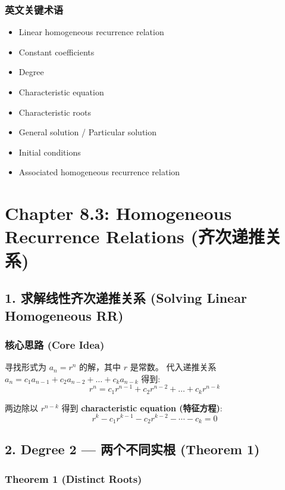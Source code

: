 \documentclass[10pt,a4paper,openany]{ctexbook}
\theoremstyle{definition}
\theoremstyle{remark}
\begin{document}
\subsubsection{英文关键术语}

\begin{itemize}
\item Linear homogeneous recurrence relation
\item Constant coefficients
\item Degree
\item Characteristic equation
\item Characteristic roots
\item General solution / Particular solution
\item Initial conditions
\item Associated homogeneous recurrence relation

\end{itemize}


\section{Chapter 8.3: Homogeneous Recurrence Relations (齐次递推关系)}

\subsection{1. 求解线性齐次递推关系 (Solving Linear Homogeneous RR)}

\subsubsection{核心思路 (Core Idea)}

寻找形式为 $a_n = r^n$ 的解，其中 $r$ 是常数。
代入递推关系 $a_n = c_1 a_{n-1} + c_2 a_{n-2} + \dots + c_k a_{n-k}$ 得到:
\[
r^n = c_1 r^{n-1} + c_2 r^{n-2} + \dots + c_k r^{n-k}
\]

两边除以 $r^{n-k}$ 得到 \textbf{characteristic equation (特征方程)}:
\[
r^k - c_1 r^{k-1} - c_2 r^{k-2} - \cdots - c_k = 0
\]

\vspace{-2pt}

\subsection{2. Degree 2 — 两个不同实根 (Theorem 1)}

\subsubsection{Theorem 1 (Distinct Roots)}
\end{document}
